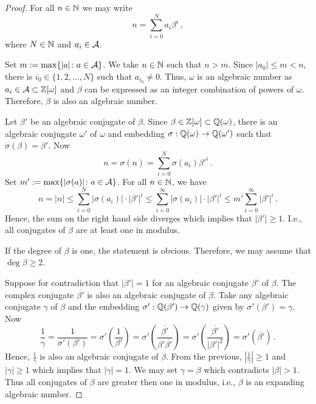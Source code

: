 \documentclass{article}
\begin{document}
\begin{proof}
For all $n\in\mathbb{N}$ we may write 
    $$
    n=\sum_{i=0}^{N}a_i\beta^i\,,
    $$
    where $N\in\mathbb{N}$ and $a_i\in\mathcal{A}$.
    
    Set $m:= \max\{|a|\colon a\in\mathcal{A}\}$. We take $n\in\mathbb{N}$ such that $n>m$. 
    Since $|a_0|\leq m<n$, there is $i_0 \in \{1,2,\dots,N\}$ such that $a_{i_0}\neq 0$. Thus, $\omega$ is an algebraic number as $a_i\in\mathcal{A}\subset\mathbb{Z}[\omega]$ and $\beta$ can be expressed as an integer combination of powers of $\omega$. Therefore, $\beta$ is also an algebraic number.
    
    Let $\beta'$ be an algebraic conjugate of $\beta$.  
    Since $\beta\in\mathbb{Z}[\omega]\subset\mathbb{Q}(\omega)$, there is an algebraic conjugate $\omega'$ of $\omega$ and embedding $\sigma: \mathbb{Q}(\omega)\rightarrow \mathbb{Q}(\omega')$ such that $\sigma(\beta)=\beta'$. Now 
    $$
    n=\sigma(n)=\sum_{i=0}^{N}\sigma(a_i)\beta'^i\,.
    $$
    Set $m':= \max\{|\sigma(a)|\colon a\in\mathcal{A}\}$.  For all $n\in\mathbb{N}$, we have 
    $$
    n=|n|\leq\sum_{i=0}^{N}|\sigma(a_i)|\cdot|\beta'|^i \leq \sum_{i=0}^{\infty}|\sigma(a_i)|\cdot|\beta'|^i \leq m'\sum_{i=0}^{\infty}|\beta'|^i\,.  
    $$
    Hence, the sum on the right hand side diverges which implies that $|\beta'|\geq 1$. I.e., all conjugates of $\beta$ are at least one in modulus.
    
    If the degree of $\beta$ is one, the statement is obvious.  Therefore, we may assume that $\deg \beta \geq 2$. 
    
    Suppose  for contradiction that $|\beta'|=1$ for an algebraic conjugate $\beta'$  of $\beta$. The complex conjugate $\overline{\beta'}$ is also an algebraic conjugate of $\beta$. Take any algebraic conjugate $\gamma$ of $\beta$ and the embedding $\sigma': \mathbb{Q}(\beta')\rightarrow \mathbb{Q}(\gamma)$ given by $\sigma'(\beta')=\gamma$.
    Now
    $$
    \frac{1}{\gamma}=\frac{1}{\sigma'(\beta')}=\sigma'\left(\frac{1}{\beta'}\right)=\sigma'\left(\frac{\overline{\beta'}}{\beta'\overline{\beta'}}\right)=\sigma'\left(\frac{\overline{\beta'}}{|\beta'|^2}\right)=\sigma'(\overline{\beta'})\,.
    $$
    Hence, $\frac{1}{\gamma}$ is also an algebraic conjugate of $\beta$. From the previous, $\left|\frac{1}{\gamma}\right|\geq 1$ and $|\gamma|\geq 1$ which implies that $|\gamma|=1$. We may set $\gamma=\beta$ which contradicts $|\beta|>1$. Thus all conjugates of $\beta$ are greater then one in modulus, i.e., $\beta$ is an expanding algebraic number.
\end{proof}
\end{document}
